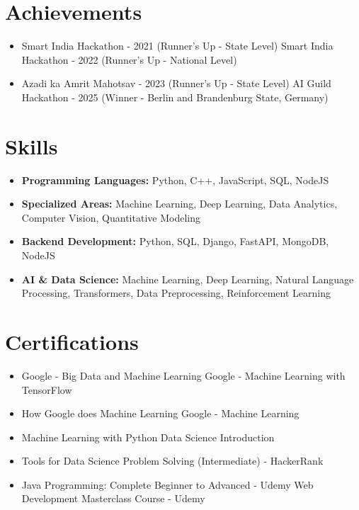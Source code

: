 \documentclass[a4paper,10pt]{article}
\begin{document}
\section*{Achievements}
\begin{itemize}
\item Smart India Hackathon - 2021 (Runner's Up - State Level) \hfill Smart India Hackathon - 2022 (Runner's Up - National Level)
\item Azadi ka Amrit Mahotsav - 2023 (Runner's Up - State Level) \hfill AI Guild Hackathon - 2025 (Winner - Berlin and Brandenburg State, Germany)
\end{itemize}

\section*{Skills}
\begin{itemize}
  \item \textbf{Programming Languages:} Python, C++, JavaScript, SQL, NodeJS
  \item \textbf{Specialized Areas:} Machine Learning, Deep Learning, Data Analytics, Computer Vision, Quantitative Modeling
  \item \textbf{Backend Development:} Python, SQL, Django, FastAPI, MongoDB, NodeJS
  \item \textbf{AI \& Data Science:} Machine Learning, Deep Learning, Natural Language Processing, Transformers, Data Preprocessing, Reinforcement Learning
\end{itemize}

\section*{Certifications}
\begin{itemize}
\item Google - Big Data and Machine Learning \hfill Google - Machine Learning with TensorFlow
\item How Google does Machine Learning \hfill Google - Machine Learning
\item Machine Learning with Python \hfill Data Science Introduction
\item Tools for Data Science \hfill Problem Solving (Intermediate) - HackerRank
\item Java Programming: Complete Beginner to Advanced - Udemy \hfill Web Development Masterclass Course - Udemy
\end{itemize}
\end{document}
